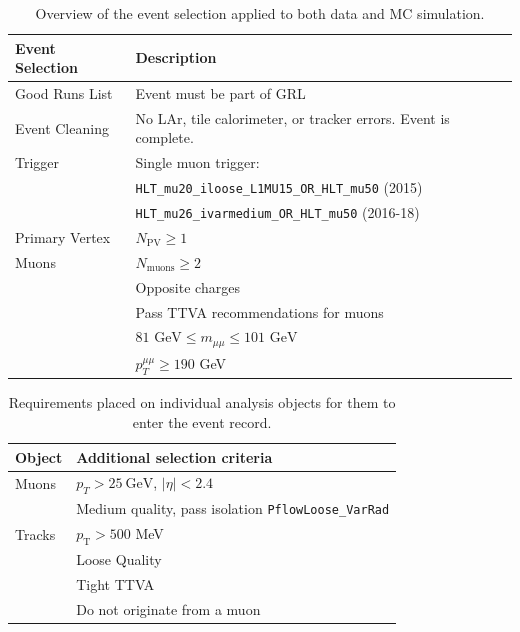 \begin{table}[htb]
    \centering
    \begin{tabular}{l|l}
         \hline
    \textbf{Event Selection} & \textbf{Description} \\ \hline
    Good Runs List & Event must be part of GRL \\ \hline
    Event Cleaning & No LAr, tile calorimeter, or tracker errors. Event is complete. \\ \hline
    Trigger & Single muon trigger: \\
    & \texttt{HLT\_mu20\_iloose\_L1MU15\_OR\_HLT\_mu50} (2015) \\
    & \texttt{HLT\_mu26\_ivarmedium\_OR\_HLT\_mu50} (2016-18) \\ \hline
    Primary Vertex & $N_{\text{PV}}\geq1$ \\ \hline
    Muons & $N_{\text{muons}}\geq2$ \\
          & Opposite charges \\
          & Pass TTVA recommendations for muons \\
          & $81\text{ GeV}\leq m_{\mu\mu}\leq 101\text{ GeV}$ \\
          & $p_T^{\mu\mu}\geq 190$ GeV \\ \hline
    \end{tabular}
    \caption{Overview of the event selection applied to both data and MC simulation.}
    \label{tab:eventsel}
\end{table}

\begin{table}[htb]
    \centering
    \begin{tabular}{l|l}
    \hline
     \textbf{Object} & \textbf{Additional selection criteria} \\ \hline
     Muons & $p_T>25~\text{GeV}$, $|\eta|<2.4$ \\
           & Medium quality, pass isolation \texttt{PflowLoose\_VarRad} \\ \hline
     Tracks & $p_{\text{T}} > 500$ MeV \\
            & Loose Quality \\
            & Tight TTVA \\
            & Do not originate from a muon \\ \hline
    \end{tabular}
    \caption{Requirements placed on individual analysis objects for them to enter the event record.}
    \label{tab:ObjCuts}
\end{table}

